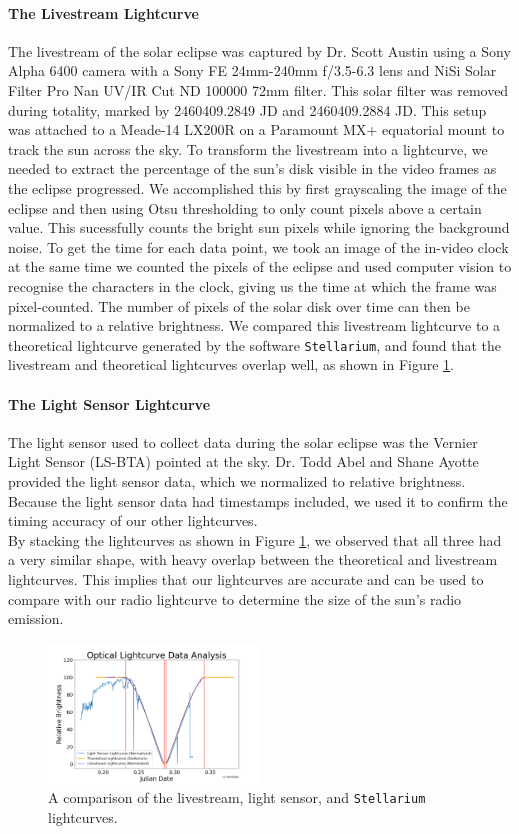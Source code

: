 \paragraph{The Livestream Lightcurve}
The livestream of the solar eclipse was captured by Dr. Scott Austin using a Sony Alpha 6400 camera with a Sony FE 24mm-240mm f/3.5-6.3 lens and NiSi Solar Filter Pro Nan UV/IR Cut ND 100000 72mm filter.
This solar filter was removed during totality, marked by 2460409.2849 JD and 2460409.2884 JD.
This setup was attached to a Meade-14 LX200R on a Paramount MX+ equatorial mount to track the sun across the sky.
To transform the livestream into a lightcurve, we needed to extract the percentage of the sun's disk visible in the video frames as the eclipse progressed.
We accomplished this by first grayscaling the image of the eclipse and then using Otsu thresholding to only count pixels above a certain value.
This sucessfully counts the bright sun pixels while ignoring the background noise.
To get the time for each data point, we took an image of the in-video clock at the same time we counted the pixels of the eclipse and used computer vision to recognise the characters in the clock, giving us the time at which the frame was pixel-counted.
The number of pixels of the solar disk over time can then be normalized to a relative brightness.
We compared this livestream lightcurve to a theoretical lightcurve generated by the software \texttt{Stellarium}\cite{zotti_simulated_2020}, and found that the livestream and theoretical lightcurves overlap well, as shown in Figure \ref{fig:OpticalLightcurveComparison}.
\paragraph{The Light Sensor Lightcurve}
The light sensor used to collect data during the solar eclipse was the Vernier Light Sensor (LS-BTA) pointed at the sky.
Dr. Todd Abel and Shane Ayotte provided the light sensor data, which we normalized to relative brightness.
Because the light sensor data had timestamps included, we used it to confirm the timing accuracy of our other lightcurves.
\\
By stacking the lightcurves as shown in Figure \ref{fig:OpticalLightcurveComparison}, we observed that all three had a very similar shape, with heavy overlap between the theoretical and livestream lightcurves.
This implies that our lightcurves are accurate and can be used to compare with our radio lightcurve to determine the size of the sun's radio emission.

\begin{figure}[h]
    \includegraphics[width=0.5\textwidth]{figures/OpticalLightcurveComparison}
    \caption{\label{fig:OpticalLightcurveComparison} A comparison of the livestream, light sensor, and \texttt{Stellarium} lightcurves.}
\end{figure}
